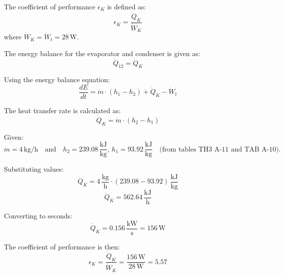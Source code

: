 The coefficient of performance \( \epsilon_K \) is defined as:  
\[
\epsilon_K = \frac{\dot{Q}_K}{\dot{W}_K}
\]  
where \( \dot{W}_K = \dot{W}_t = 28 \, \text{W} \).  

The energy balance for the evaporator and condenser is given as:  
\[
\dot{Q}_{12} = \dot{Q}_K
\]  

Using the energy balance equation:  
\[
\frac{dE}{dt} = \dot{m} \cdot (h_1 - h_2) + \dot{Q}_K - \dot{W}_t
\]  

The heat transfer rate is calculated as:  
\[
\dot{Q}_K = \dot{m} \cdot (h_2 - h_1)
\]  

Given:  
\[
\dot{m} = 4 \, \text{kg/h} \quad \text{and} \quad h_2 = 239.08 \, \frac{\text{kJ}}{\text{kg}}, \, h_1 = 93.92 \, \frac{\text{kJ}}{\text{kg}} \quad \text{(from tables TH3 A-11 and TAB A-10)}.
\]  

Substituting values:  
\[
\dot{Q}_K = 4 \, \frac{\text{kg}}{\text{h}} \cdot (239.08 - 93.92) \, \frac{\text{kJ}}{\text{kg}}
\]  
\[
\dot{Q}_K = 562.64 \, \frac{\text{kJ}}{\text{h}}
\]  

Converting to seconds:  
\[
\dot{Q}_K = 0.156 \, \frac{\text{kW}}{\text{s}} = 156 \, \text{W}
\]  

The coefficient of performance is then:  
\[
\epsilon_K = \frac{\dot{Q}_K}{\dot{W}_K} = \frac{156 \, \text{W}}{28 \, \text{W}} = 5.57
\]